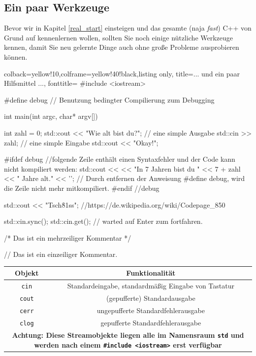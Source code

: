 \documentclass[a4paper]{report}
\begin{document}
\subsection{Ein paar Werkzeuge}
Bevor wir in Kapitel \ref{real_start} einsteigen und das gesamte (naja \textit{fast}) C++ von Grund auf kennenlernen wollen, sollten Sie noch einige nützliche Werkzeuge kennen, damit Sie neu gelernte Dinge auch ohne große Probleme ausprobieren können.
\begin{tcblisting}{colback=yellow!10,colframe=yellow!40!black,listing only,
		title=... und ein paar Hilfsmittel ..., fonttitle=\bfseries}
#include <iostream>


#define debug // Benutzung bedingter Compilierung zum Debugging

int main(int argc, char* argv[]){
	
	int zahl = 0;
	std::cout << "Wie alt bist du?\n"; // eine simple Ausgabe
	std::cin >> zahl; // eine simple Eingabe
	std::cout << "Okay!\n\n";
	
#ifdef debug 
	//folgende Zeile enthält einen Syntaxfehler und der Code kann nicht kompiliert werden:
	std::cout << << "In 7 Jahren bist du " << 7 + zahl << " Jahre alt." << '\n';
	// Durch entfernen der Anweisung #define debug, wird die Zeile nicht mehr mitkompiliert.
#endif //debug
	
	std::cout << "Tsch\h81ss\n";
	//https://de.wikipedia.org/wiki/Codepage_850
	
	std::cin.sync();
	std::cin.get(); // warted auf Enter zum fortfahren.
	
	/*
	Das ist
	ein mehrzeiliger
	Kommentar
	*/
	
	// Das ist ein einzeiliger Kommentar.
}
\end{tcblisting}
\begin{center}
\begin{tabular}{|c|c|}
	\hline
	\textbf{Objekt} & \textbf{Funktionalität} \\
	\hline \hline
	\texttt{cin}	& Standardeingabe, standardmäßig Eingabe von Tastatur \\
	\hline
	\texttt{cout}	& (gepufferte) Standardausgabe \\
	\texttt{cerr}	& ungepufferte Standardfehlerausgabe \\
	\texttt{clog}	& gepufferte Standardfehlerausgabe \\
	\hline
	\multicolumn{2}{|p{11cm}|}{\textbf{Achtung: Diese Streamobjekte liegen alle im Namensraum \texttt{std} und werden nach einem \texttt{\#include <iostream>} erst verfügbar}}\\
	\hline
\end{tabular}
\end{center}
\end{document}
